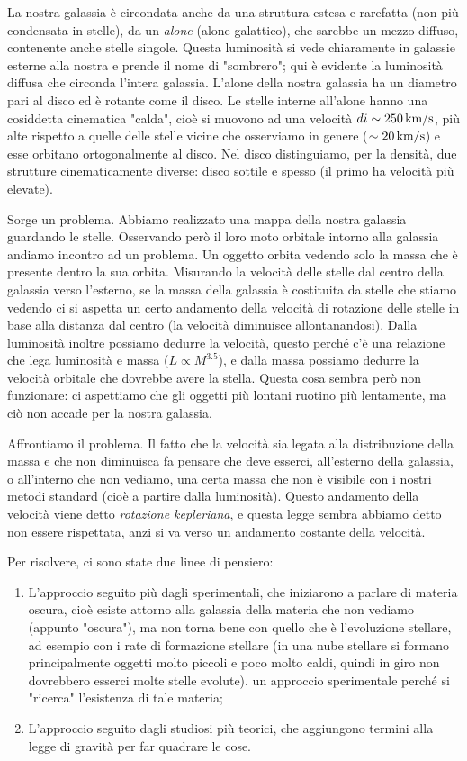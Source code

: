 La nostra galassia è circondata anche da una struttura estesa e rarefatta (non più condensata in stelle), da un \textit{alone} (alone galattico), che sarebbe un mezzo diffuso, contenente anche stelle singole. Questa luminosità si vede chiaramente in galassie esterne alla nostra e prende il nome di "sombrero"; qui è evidente la luminosità diffusa che circonda l'intera galassia. L'alone della nostra galassia ha un diametro pari al disco ed è rotante come il disco. Le stelle interne all'alone hanno una cosiddetta cinematica "calda", cioè si muovono ad una velocità $di \sim 250 \rm \, km/s$, più alte rispetto a quelle delle stelle vicine che osserviamo in genere ($\sim 20 \rm \, km/s$) e esse orbitano ortogonalmente al disco. Nel disco distinguiamo, per la densità, due strutture cinematicamente diverse: disco sottile e spesso (il primo ha velocità più elevate).

Sorge un problema. Abbiamo realizzato una mappa della nostra galassia guardando le stelle. Osservando però il loro moto orbitale intorno alla galassia andiamo incontro ad un problema. Un oggetto orbita vedendo solo la massa che è presente dentro la sua orbita. Misurando la velocità delle stelle dal centro della galassia verso l'esterno, se la massa della galassia è costituita da stelle che stiamo vedendo ci si aspetta un certo andamento della velocità di rotazione delle stelle in base alla distanza dal centro (la velocità diminuisce allontanandosi). Dalla luminosità inoltre possiamo dedurre la velocità, questo perché c'è una relazione che lega luminosità e massa ($L \propto M^{3.5}$), e dalla massa possiamo dedurre la velocità orbitale che dovrebbe avere la stella. Questa cosa sembra però non funzionare: ci aspettiamo che gli oggetti più lontani ruotino più lentamente, ma ciò non accade per la nostra galassia.

Affrontiamo il problema. Il fatto che la velocità sia legata alla distribuzione della massa e che non diminuisca fa pensare che deve esserci, all'esterno della galassia, o all'interno che non vediamo, una certa massa che non è visibile con i nostri metodi standard (cioè a partire dalla luminosità). Questo andamento della velocità viene detto \textit{rotazione kepleriana}, e questa legge sembra abbiamo detto non essere rispettata, anzi si va verso un andamento costante della velocità.

Per risolvere, ci sono state due linee di pensiero:
\begin{enumerate}
    \item L'approccio seguito più dagli sperimentali, che iniziarono a parlare di materia oscura, cioè esiste attorno alla galassia della materia che non vediamo (appunto "oscura"), ma non torna bene con quello che è l'evoluzione stellare, ad esempio con i rate di formazione stellare (in una nube stellare si formano principalmente oggetti molto piccoli e poco molto caldi, quindi in giro non dovrebbero esserci molte stelle evolute). \E un approccio sperimentale perché si "ricerca" l'esistenza di tale materia;
    \item L'approccio seguito dagli studiosi più teorici, che aggiungono termini alla legge di gravità per far quadrare le cose.
\end{enumerate}

